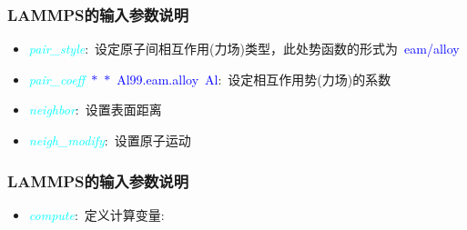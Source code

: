 \frame
{
	\frametitle{\textrm{LAMMPS}的输入参数说明}
{\fontsize{7.5pt}{6.0pt}\selectfont{
}
\begin{itemize}
	\item \textcolor{cyan}{\textit{pair\_style}}:~设定原子间相互作用(力场)类型，此处势函数的形式为~\textcolor{blue}{\textrm{eam/alloy}}
	\item \textcolor{cyan}{\textit{pair\_coeff}}~\textcolor{blue}{\textrm{$\ast$~$\ast$~Al99.eam.alloy~Al}}:~设定相互作用势(力场)的系数\\
		{\fontsize{6.2pt}{5.2pt}}
	\item \textcolor{cyan}{\textit{neighbor}}:~设置表面距离
	\item \textcolor{cyan}{\textit{neigh\_modify}}:~设置原子运动
\end{itemize}
}
}

\frame
{
	\frametitle{\textrm{LAMMPS}的输入参数说明}
	{\fontsize{7.5pt}{6.0pt}\selectfont{
}
\begin{itemize}
	\item \textcolor{cyan}{\textit{compute}}:~定义计算变量:\\
		\begin{enumerate}
{\fontsize{7.5pt}{5.0pt}}
		\end{enumerate}
\end{itemize}
}
}


